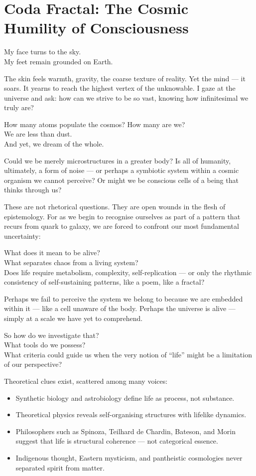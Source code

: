 \section{Coda Fractal: The Cosmic Humility of Consciousness}

My face turns to the sky.\\
My feet remain grounded on Earth.

The skin feels warmth, gravity, the coarse texture of reality. Yet the mind — it soars. It yearns to reach the highest vertex of the unknowable. I gaze at the universe and ask: how can we strive to be so vast, knowing how infinitesimal we truly are?

How many atoms populate the cosmos? How many are we?\\
We are less than dust.\\
And yet, we dream of the whole.

Could we be merely microstructures in a greater body? Is all of humanity, ultimately, a form of noise — or perhaps a symbiotic system within a cosmic organism we cannot perceive? Or might we be conscious cells of a being that thinks through us?

These are not rhetorical questions. They are open wounds in the flesh of epistemology. For as we begin to recognise ourselves as part of a pattern that recurs from quark to galaxy, we are forced to confront our most fundamental uncertainty:

What does it mean to be alive?\\
What separates chaos from a living system?\\
Does life require metabolism, complexity, self-replication — or only the rhythmic consistency of self-sustaining patterns, like a poem, like a fractal?

Perhaps we fail to perceive the system we belong to because we are embedded within it — like a cell unaware of the body. Perhaps the universe is alive — simply at a scale we have yet to comprehend.

So how do we investigate that?\\
What tools do we possess?\\
What criteria could guide us when the very notion of “life” might be a limitation of our perspective?

Theoretical clues exist, scattered among many voices:
\begin{itemize}
  \item Synthetic biology and astrobiology define life as process, not substance.
  \item Theoretical physics reveals self-organising structures with lifelike dynamics.
  \item Philosophers such as Spinoza, Teilhard de Chardin, Bateson, and Morin suggest that life is structural coherence — not categorical essence.
  \item Indigenous thought, Eastern mysticism, and pantheistic cosmologies never separated spirit from matter.
\end{itemize}

